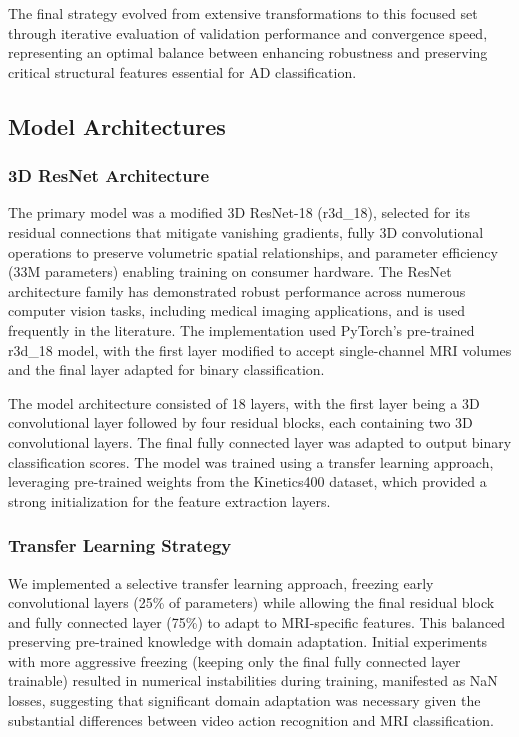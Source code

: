 \documentclass[12pt, a4paper]{article}
\begin{document}
The final strategy evolved from extensive transformations to this focused set through iterative evaluation of validation performance and convergence speed, representing an optimal balance between enhancing robustness and preserving critical structural features essential for AD classification.
\subsection{Model Architectures}
\subsubsection{3D ResNet Architecture}

The primary model was a modified 3D ResNet-18 (r3d\_18), selected for its residual connections that mitigate vanishing gradients, fully 3D convolutional operations to preserve volumetric spatial relationships, and parameter efficiency (33M parameters) enabling training on consumer hardware. The ResNet architecture family has demonstrated robust performance across numerous computer vision tasks, including medical imaging applications, and is used frequently in the literature. The implementation used PyTorch's pre-trained r3d\_18 model, with the first layer modified to accept single-channel MRI volumes and the final layer adapted for binary classification.

The model architecture consisted of 18 layers, with the first layer being a 3D convolutional layer followed by four residual blocks, each containing two 3D convolutional layers. The final fully connected layer was adapted to output binary classification scores. The model was trained using a transfer learning approach, leveraging pre-trained weights from the Kinetics400 dataset, which provided a strong initialization for the feature extraction layers.

\subsubsection{Transfer Learning Strategy}

We implemented a selective transfer learning approach, freezing early convolutional layers (25\% of parameters) while allowing the final residual block and fully connected layer (75\%) to adapt to MRI-specific features. This balanced preserving pre-trained knowledge with domain adaptation. Initial experiments with more aggressive freezing (keeping only the final fully connected layer trainable) resulted in numerical instabilities during training, manifested as NaN losses, suggesting that significant domain adaptation was necessary given the substantial differences between video action recognition and MRI classification.
\end{document}
